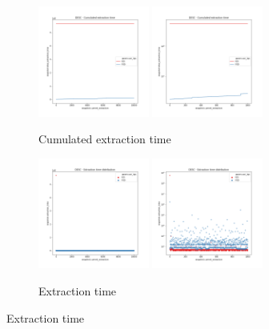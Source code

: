 \begin{figure}
    \centering
    \begin{subfigure}[b]{\textwidth}
        \centering
        \includegraphics[width=0.40\textwidth]{./fragments/04_experimental_execution/images/01_basebenchmark_03_sort_d_case.png.0_0.png}
        \includegraphics[width=0.40\textwidth]{./fragments/04_experimental_execution/images/01_basebenchmark_03_sort_d_case.png.0_1.png}
        \caption{Cumulated extraction time}
        \label{FIG:BENCHMARK_03_DESC_CASE__0_0}
    \end{subfigure}

    \begin{subfigure}[b]{\textwidth}
        \centering
        \includegraphics[width=0.40\textwidth]{./fragments/04_experimental_execution/images/01_basebenchmark_03_sort_d_case.png.1_0.png}
        \includegraphics[width=0.40\textwidth]{./fragments/04_experimental_execution/images/01_basebenchmark_03_sort_d_case.png.1_1.png}
        \caption{Extraction time}
        \label{FIG:BENCHMARK_03_DESC_CASE__0_0}
    \end{subfigure}


\end{figure}
